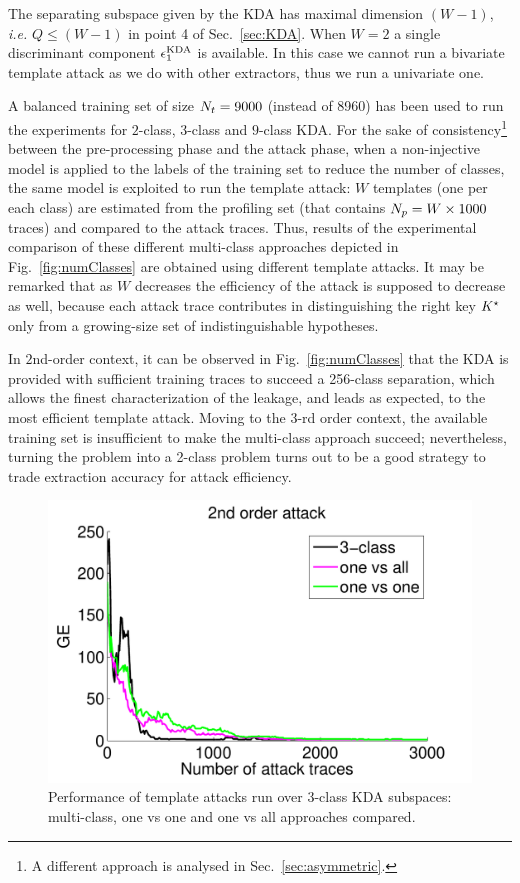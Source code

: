 \begin{remark}\label{rem:numComp}
The separating subspace given by the KDA has maximal dimension $(W-1)$, \emph{i.e.} $Q\leq (W-1)$ in point 4 of Sec.~\ref{sec:KDA}. When $W=2$ a single discriminant component $\epsilon^{\mathrm{KDA}}_1$ is available. In this case we cannot run a bivariate template attack as we do with other extractors, thus we run a univariate one. \\
\end{remark}


A balanced training set of size $N_t=9000$ (instead of 8960) has been used to run the experiments for $2$-class, $3$-class and $9$-class KDA. For the sake of consistency\footnote{A different approach is analysed in Sec.~\ref{sec:asymmetric}.} between the pre-processing phase and the attack phase, when a non-injective model is applied to the labels of the training set to reduce the number of classes, the same model is exploited to run the template attack: $W$ templates (one per each class) are estimated from the profiling set (that contains $N_p = W\times 1000$ traces) and compared to the attack traces. Thus, results of the experimental comparison of these different multi-class approaches depicted in  Fig.~\ref{fig:numClasses} are obtained using different template attacks. It may be remarked that as $W$ decreases the efficiency of the attack is supposed to decrease as well, because each attack trace contributes in distinguishing the right key $K^\star$ only from a growing-size set of indistinguishable hypotheses. 


 
In $2$nd-order context, it can be observed in Fig.~\ref{fig:numClasses} that the KDA is provided with sufficient training traces to succeed a 256-class separation, which allows the finest characterization of the leakage, and leads as expected, to the most efficient template attack. Moving to the $3$-rd order context, the available training set is insufficient to make the multi-class approach succeed; nevertheless, turning the problem into a 2-class problem turns out to be a good strategy to trade extraction accuracy for attack efficiency.






\begin{figure}
\centering
\includegraphics[width=.5\textwidth]{../Figures/CARDIS2016/2order_MULT.pdf}
\caption[KDA: comparison between multi-class, one vs one and one vs all approaches.]{Performance of template attacks run over 3-class KDA subspaces: multi-class, one vs one and one vs all approaches compared.}\label{fig:3multi-class}
\end{figure}

